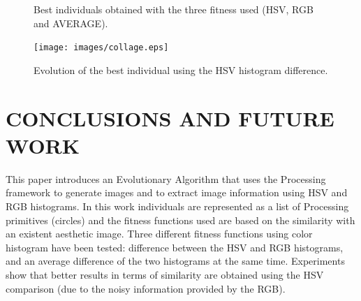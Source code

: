 \documentclass[a4paper,twoside]{article}
\begin{document}
\begin{figure}[ht]
{ }
\caption{Best individuals obtained with the three fitness used (HSV, RGB and AVERAGE).}
\label{fig:bestinds}
\end{figure}

\begin{figure}
   \texttt{[image: images/collage.eps]}
\caption{Evolution of the best individual using the HSV histogram difference. }
\label{fig:collage}
\end{figure}

\section{\uppercase{Conclusions and Future Work}}
\label{sec:conclusions}
\noindent This paper introduces an Evolutionary Algorithm that uses the Processing framework to generate images and to extract image information using HSV and RGB histograms. %
In this work individuals are represented as a list of Processing primitives (circles) and the fitness functions used are based on the similarity with an existent aesthetic image. Three different fitness functions using color histogram have been tested: difference between the HSV and RGB histograms, and an average difference of the two histograms at the same time. Experiments show that better results in terms of similarity are obtained using the HSV comparison (due to the noisy information provided by the RGB). 
\end{document}
